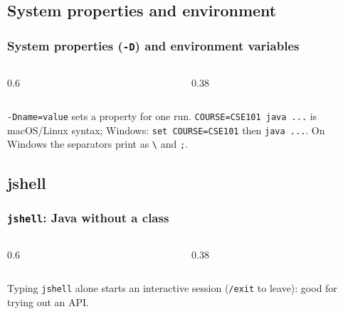 \documentclass[aspectratio=169,10pt,compress]{beamer}
\newcommand{\cmd}[1]{\texttt{\color{gitred}#1}}
\begin{document}

\subsection[Props]{System properties and environment}




\begin{frame}[t,fragile] \frametitle{System properties (\texttt{-D}) and environment variables}
  \begin{columns}[T]
    \begin{column}{0.6\textwidth}
    \end{column}
    \begin{column}{0.38\textwidth}
    \end{column}
  \end{columns}

  \vspace{0.2em}
  \small \texttt{-Dname=value} sets a property for one run. \texttt{COURSE=CSE101 java ...} is macOS/Linux syntax;
  Windows: \texttt{set COURSE=CSE101} then \texttt{java ...}. On Windows the separators print as \texttt{\textbackslash} and \texttt{;}.
\end{frame}

\subsection[JShell]{jshell}




\begin{frame}[t,fragile] \frametitle{\texttt{jshell}: Java without a class}
  \begin{columns}[T]
    \begin{column}{0.6\textwidth}
    \end{column}
    \begin{column}{0.38\textwidth}
    \end{column}
  \end{columns}

  \vspace{0.2em}
  \small Typing \cmd{jshell} alone starts an interactive session (\texttt{/exit} to leave): good for trying out an API.
\end{frame}
\end{document}
